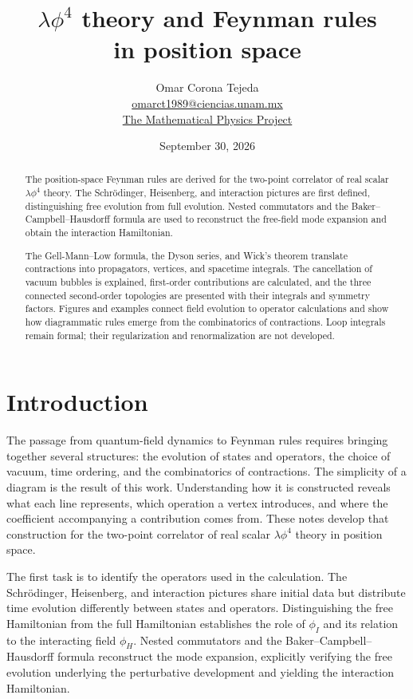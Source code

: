 \documentclass[11pt,letterpaper]{article}
\title{$\lambda\phi^4$ theory and Feynman rules\\
in position space}
\author{Omar Corona Tejeda\\
\href{mailto:omarct1989@ciencias.unam.mx}{omarct1989@ciencias.unam.mx}\\[0.2cm]
\href{https://artinnether.github.io/the_mathematical_physics_project/}
{The Mathematical Physics Project}}
\date{September 30, 2026}
\theoremstyle{definition}
\theoremstyle{definition}
\begin{document}
\maketitle

\begin{abstract}
The position-space Feynman rules are derived for the two-point correlator
of real scalar $\lambda\phi^4$ theory. The Schrödinger, Heisenberg, and
interaction pictures are first defined, distinguishing free evolution
from full evolution. Nested commutators and the Baker--Campbell--Hausdorff
formula are used to reconstruct the free-field mode expansion and obtain
the interaction Hamiltonian.

The Gell-Mann--Low formula, the Dyson series, and Wick's theorem translate
contractions into propagators, vertices, and spacetime integrals. The
cancellation of vacuum bubbles is explained, first-order contributions
are calculated, and the three connected second-order topologies are
presented with their integrals and symmetry factors. Figures and examples connect field evolution to operator calculations and
show how diagrammatic rules emerge from the combinatorics of contractions. Loop integrals remain formal; their regularization and
renormalization are not developed.
\end{abstract}

\section{Introduction}

The passage from quantum-field dynamics to Feynman rules requires bringing
together several structures: the evolution of states and operators, the
choice of vacuum, time ordering, and the combinatorics of contractions.
The simplicity of a diagram is the result of this work. Understanding how
it is constructed reveals what each line represents, which operation a
vertex introduces, and where the coefficient accompanying a contribution
comes from. These notes develop that construction for the two-point
correlator of real scalar $\lambda\phi^4$ theory in position space.

The first task is to identify the operators used in the calculation.
The Schrödinger, Heisenberg, and interaction pictures share initial data
but distribute time evolution differently between states and operators.
Distinguishing the free Hamiltonian from the full Hamiltonian establishes
the role of $\phi_I$ and its relation to the interacting field $\phi_H$.
Nested commutators and the Baker--Campbell--Hausdorff formula reconstruct
the mode expansion, explicitly verifying the free evolution underlying
the perturbative development and yielding the interaction Hamiltonian.
\end{document}
